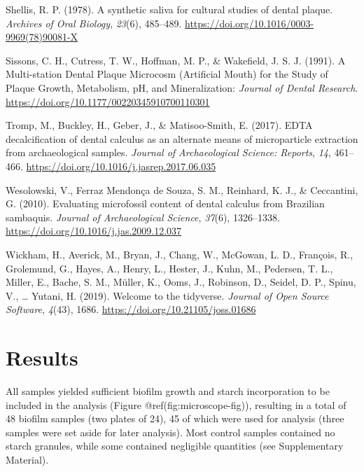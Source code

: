 \documentclass[
  letterpaper,
]{book}
\newlength{\cslhangindent}
\newlength{\cslentryspacingunit} %
\newenvironment{CSLReferences}[2] %
 {%
  \setlength{\parindent}{0pt}
  \ifodd #1
  \let\oldpar\par
  \def\par{\hangindent=\cslhangindent\oldpar}
  \fi
  \setlength{\parskip}{#2\cslentryspacingunit}
 }%
 {}
\begin{document}
\begin{CSLReferences}{1}{0}
\leavevmode{}%
Shellis, R. P. (1978). A synthetic saliva for cultural studies of dental
plaque. \emph{Archives of Oral Biology}, \emph{23}(6), 485--489.
\url{https://doi.org/10.1016/0003-9969(78)90081-X}

\leavevmode{}%
Sissons, C. H., Cutress, T. W., Hoffman, M. P., \& Wakefield, J. S. J.
(1991). A {Multi-station Dental Plaque Microcosm} ({Artificial Mouth})
for the {Study} of {Plaque Growth}, {Metabolism}, {pH}, and
{Mineralization}: \emph{Journal of Dental Research}.
\url{https://doi.org/10.1177/00220345910700110301}

\leavevmode{}%
Tromp, M., Buckley, H., Geber, J., \& Matisoo-Smith, E. (2017). {EDTA}
decalcification of dental calculus as an alternate means of
microparticle extraction from archaeological samples. \emph{Journal of
Archaeological Science: Reports}, \emph{14}, 461--466.
\url{https://doi.org/10.1016/j.jasrep.2017.06.035}

\leavevmode{}%
Wesolowski, V., Ferraz Mendonça de Souza, S. M., Reinhard, K. J., \&
Ceccantini, G. (2010). Evaluating microfossil content of dental calculus
from {Brazilian} sambaquis. \emph{Journal of Archaeological Science},
\emph{37}(6), 1326--1338.
\url{https://doi.org/10.1016/j.jas.2009.12.037}

\leavevmode{}%
Wickham, H., Averick, M., Bryan, J., Chang, W., McGowan, L. D.,
François, R., Grolemund, G., Hayes, A., Henry, L., Hester, J., Kuhn, M.,
Pedersen, T. L., Miller, E., Bache, S. M., Müller, K., Ooms, J.,
Robinson, D., Seidel, D. P., Spinu, V., \ldots{} Yutani, H. (2019).
Welcome to the {tidyverse}. \emph{Journal of Open Source Software},
\emph{4}(43), 1686. \url{https://doi.org/10.21105/joss.01686}

\end{CSLReferences}


\hypertarget{results-1}{%
\chapter{Results}\label{results-1}}

All samples yielded sufficient biofilm growth and starch incorporation
to be included in the analysis (Figure @ref(fig:microscope-fig)),
resulting in a total of 48 biofilm samples (two plates of 24), 45 of
which were used for analysis (three samples were set aside for later
analysis). Most control samples contained no starch granules, while some
contained negligible quantities (see Supplementary Material).
\end{document}

